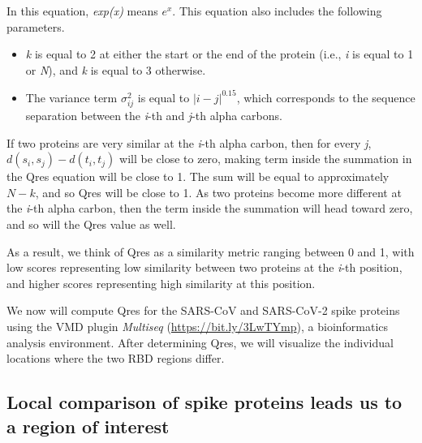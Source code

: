 In this equation, \textit{exp(x)} means $e^{x}$. This equation also includes the following parameters.

\begin{itemize}
	\item \textit{k} is equal to 2 at either the start or the end of the protein (i.e., \textit{i} is equal to 1 or \textit{N}), and \textit{k} is equal to 3 otherwise.
	\item The variance term $\sigma_{ij}^2$ is equal to $\left\lvert{i-j}\right\rvert ^{0.15}$, which corresponds to the sequence separation between the \textit{i}-th and \textit{j}-th alpha carbons.
\end{itemize}

\begin{note}\end{note}

If two proteins are very similar at the \textit{i}-th alpha carbon, then for every \textit{j}, $d(s_{i}, s_{j}) - d(t_{i}, t_{j})$ will be close to zero, making term inside the summation in the Qres equation will be close to 1. The sum will be equal to approximately $N - k$, and so Qres will be close to 1. As two proteins become more different at the \textit{i}-th alpha carbon, then the term inside the summation will head toward zero, and so will the Qres value as well.

As a result, we think of Qres as a similarity metric ranging between 0 and 1, with low scores representing low similarity between two proteins at the \textit{i}-th position, and higher scores representing high similarity at this position.

We now will compute Qres for the SARS-CoV and SARS-CoV-2 spike proteins using the VMD plugin \textit{Multiseq} (\url{https://bit.ly/3LwTYmp}), a bioinformatics analysis environment. After determining Qres, we will visualize the individual locations where the two RBD regions differ. 

\FloatBarrier
{}
\subsection{Local comparison of spike proteins leads us to a region of interest}

